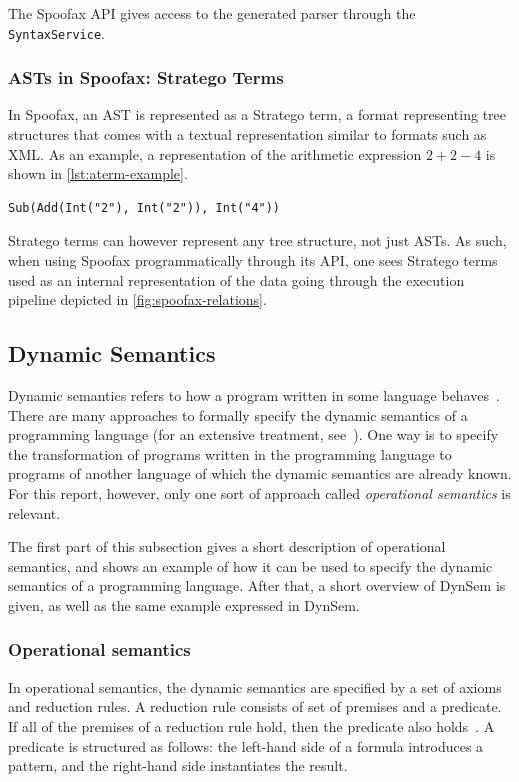 The Spoofax API gives access to the generated parser through the
\texttt{SyntaxService}.

\subsubsection{ASTs in Spoofax: Stratego Terms}
\label{sec:asts-spoof-strat}
In Spoofax, an AST is represented as a Stratego term, a format representing tree
structures that comes with a textual representation similar to formats such as
XML. As an example, a representation of the arithmetic expression $2 + 2 - 4$ is
shown in \cref{lst:aterm-example}.

\begin{lstlisting}[caption={An example Stratego term representation of an
arithmetic expression},language=aterm,label={lst:aterm-example}]
Sub(Add(Int("2"), Int("2")), Int("4"))
\end{lstlisting}

Stratego terms can however represent any tree structure, not just ASTs. As such,
when using Spoofax programmatically through its API, one sees Stratego terms
used as an internal representation of the data going through the execution
pipeline depicted in \cref{fig:spoofax-relations}.

\subsection{Dynamic Semantics}
\label{ssec:dynamic-semantics}
Dynamic semantics refers to how a program written in some language
behaves~\cite{Winskel93}. There are many approaches to formally specify the
dynamic semantics of a programming language (for an extensive treatment,
see~\cite{Winskel93}). One way is to specify the transformation of programs
written in the programming language to programs of another language of which the
dynamic semantics are already known. For this report, however, only one sort
of approach called \emph{operational semantics} is relevant.

The first part of this subsection gives a short description of operational
semantics, and shows an example of how it can be used to specify the dynamic
semantics of a programming language. After that, a short overview of DynSem is
given, as well as the same example expressed in DynSem.

\subsubsection{Operational semantics}
\label{sec:oper-semant}
In operational semantics, the dynamic semantics are specified by a set of axioms
and reduction rules. A reduction rule consists of set of premises and a
predicate. If all of the premises of a reduction rule hold, then the predicate
also holds~\cite{Kahn87}. A predicate is structured as follows: the left-hand
side of a formula introduces a pattern, and the right-hand side instantiates the
result.

